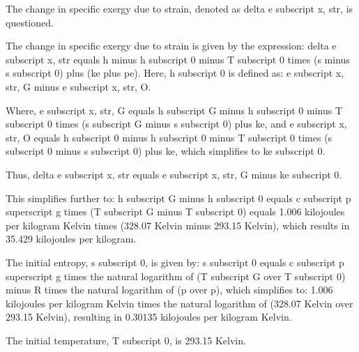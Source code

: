 The change in specific exergy due to strain, denoted as delta e subscript x, str, is questioned.

The change in specific exergy due to strain is given by the expression:
delta e subscript x, str equals h minus h subscript 0 minus T subscript 0 times (s minus s subscript 0) plus (ke plus pe). Here, h subscript 0 is defined as:
e subscript x, str, G minus e subscript x, str, O.

Where,
e subscript x, str, G equals h subscript G minus h subscript 0 minus T subscript 0 times (s subscript G minus s subscript 0) plus ke,
and
e subscript x, str, O equals h subscript 0 minus h subscript 0 minus T subscript 0 times (s subscript 0 minus s subscript 0) plus ke, which simplifies to ke subscript 0.

Thus, delta e subscript x, str equals e subscript x, str, G minus ke subscript 0.

This simplifies further to:
h subscript G minus h subscript 0 equals c subscript p superscript g times (T subscript G minus T subscript 0) equals 1.006 kilojoules per kilogram Kelvin times (328.07 Kelvin minus 293.15 Kelvin),
which results in 35.429 kilojoules per kilogram.

The initial entropy, s subscript 0, is given by:
s subscript 0 equals c subscript p superscript g times the natural logarithm of (T subscript G over T subscript 0) minus R times the natural logarithm of (p over p),
which simplifies to:
1.006 kilojoules per kilogram Kelvin times the natural logarithm of (328.07 Kelvin over 293.15 Kelvin), resulting in 0.30135 kilojoules per kilogram Kelvin.

The initial temperature, T subscript 0, is 293.15 Kelvin.